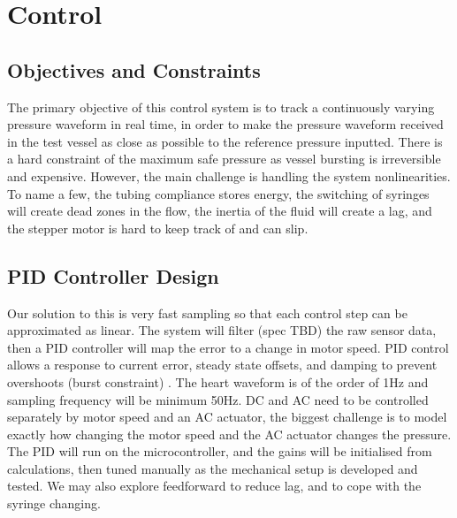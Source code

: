 \documentclass[10pt, a4paper]{article}
\begin{document}
\section{Control}
\subsection{Objectives and Constraints}
The primary objective of this control system is to track a continuously varying pressure waveform in real time, in order to make the pressure waveform received in the test vessel as close as possible to the reference pressure inputted. There is a hard constraint of the maximum safe pressure as vessel bursting is irreversible and expensive. However, the main challenge is handling the system nonlinearities. To name a few, the tubing compliance stores energy, the switching of syringes will create dead zones in the flow, the inertia of the fluid will create a lag, and the stepper motor is hard to keep track of and can slip.
\subsection{PID Controller Design}
Our solution to this is very fast sampling so that each control step can be approximated as linear. The system will filter (spec TBD) the raw sensor data, then a PID controller will map the error to a change in motor speed. PID control allows a response to current error, steady state offsets, and damping to prevent overshoots (burst constraint) \supercite{smuts2002pid}. The heart waveform is of the order of 1Hz and sampling frequency will be minimum 50Hz. DC and AC need to be controlled separately by motor speed and an AC actuator, the biggest challenge is to model exactly how changing the motor speed and the AC actuator changes the pressure. The PID will run on the microcontroller, and the gains will be initialised from calculations, then tuned manually as the mechanical setup is developed and tested. We may also explore feedforward to reduce lag, and to cope with the syringe changing.
\end{document}
